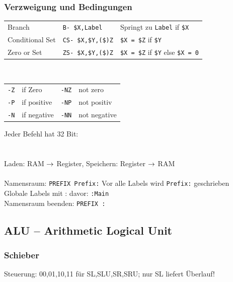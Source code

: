 \documentclass[fs]{latex4ei}
\begin{document}
\begin{multicols}{4}
		\subsubsection{Verzweigung und Bedingungen}
		\begin{tabular}{ll|l}
		Branch & \texttt{B- \$X,Label} & Springt zu \texttt{Label} if \texttt{\$X} \\
		Conditional Set & \texttt{CS- \$X,\$Y,(\$)Z} & \texttt{\$X = \$Z} if \texttt{\$Y} \\
		Zero or Set & \texttt{ZS- \$X,\$Y,(\$)Z} & \texttt{\$X = \$Z} if \texttt{\$Y} else \texttt{\$X = 0}\\ 
		\end{tabular}\\
		\begin{tabular}{ll|ll}
			\texttt{-Z} & if Zero & \texttt{-NZ} & not zero\\
			\texttt{-P} & if positive & \texttt{-NP} & not positiv\\
			\texttt{-N} & if negative & \texttt{-NN} & not negative \\
		\end{tabular}	
		
		
		
	

	Jeder Befehl hat 32 Bit:\\
	\\
	\\
	Laden: RAM $\rightarrow$ Register, Speichern: Register $\rightarrow$ RAM\\ 
	\\
	Namensraum: \texttt{PREFIX Prefix:} Vor alle Labels wird \texttt{Prefix:} geschrieben\\
	Globale Labels mit : davor: \texttt{:Main}\\
	Namensraum beenden: \texttt{PREFIX :}\\



	\subsection{ALU – Arithmetic Logical Unit}
	
	
		\subsubsection{Schieber}
		Steuerung: 00,01,10,11 für SL,SLU,SR,SRU; \quad nur SL liefert Überlauf!\\
	

\end{multicols}
\end{document}
